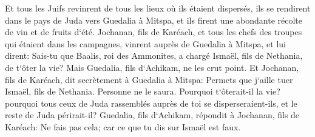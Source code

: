 \verse Et tous les Juifs revinrent de tous les lieux où ils étaient dispersés, ils se rendirent dans le pays de Juda vers Guedalia à Mitspa, et ils firent une abondante récolte de vin et de fruits d`été. 
\verse Jochanan, fils de Karéach, et tous les chefs des troupes qui étaient dans les campagnes, vinrent auprès de Guedalia à Mitspa, 
\verse et lui dirent: Sais-tu que Baalis, roi des Ammonites, a chargé Ismaël, fils de Nethania, de t`ôter la vie? Mais Guedalia, fils d`Achikam, ne les crut point. 
\verse Et Jochanan, fils de Karéach, dit secrètement à Guedalia à Mitspa: Permets que j`aille tuer Ismaël, fils de Nethania. Personne ne le saura. Pourquoi t`ôterait-il la vie? pourquoi tous ceux de Juda rassemblés auprès de toi se disperseraient-ils, et le reste de Juda périrait-il? 
\verse Guedalia, fils d`Achikam, répondit à Jochanan, fils de Karéach: Ne fais pas cela; car ce que tu dis sur Ismaël est faux. 

